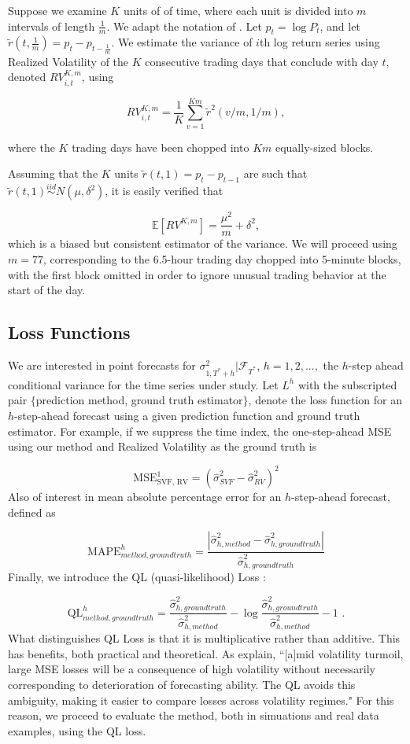 \documentclass[11pt,3p,review,authoryear]{elsarticle}
\newcommand{\simiid}{\stackrel{iid}{\sim}} %
\def\E{\mathbb{E}} %
\theoremstyle{definition}
\begin{document}
    Suppose we examine $K$ units of of time, where each unit is divided into $m$ intervals of length $\frac{1}{m}$.  We adapt the notation of \citet{andersen2008realized}. Let $p_{t} = \log{P_{t}}$, and let $\tilde{r}(t,\frac{1}{m}) = p_{t} - p_{t-\frac{1}{m}}$.  We estimate the variance of $i$th log return series using Realized Volatility of the $K$ consecutive trading days that conclude with day $t$, denoted $RV_{i,t}^{K,m}$, using
    
    $$RV_{i,t}^{K,m} = \frac{1}{K}\sum^{Km}_{v=1}\tilde{r}^{2}(v/m,1/m),$$

    where the $K$ trading days have been chopped into $Km$ equally-sized blocks.

    Assuming that the $K$ units $\tilde{r}(t, 1) = p_{t} - p_{t-1}$ are such that $\tilde{r}(t, 1) \simiid N(\mu, \delta^{2})$, it is easily verified that 
    
    $$\E[RV^{K,m}] = \frac{\mu^{2}}{m} + \delta^{2},$$
    which is a biased but consistent estimator of the variance.  We will proceed using $m = 77$, corresponding to the 6.5-hour trading day chopped into 5-minute blocks, with the first block omitted in order to ignore unusual trading behavior at the start of the day.

\subsection{Loss Functions}\label{loss_function}

We are interested in point forecasts for $\sigma^{2}_{1,T^{*}+h}|\mathcal{F}_{T^{*}}$, $h=1,2,...,$ the $h$-step ahead conditional variance for the time series under study.  Let $L^{h}$ with the subscripted pair $\{$prediction method, ground truth estimator$\}$, denote the loss function for an $h$-step-ahead forecast using a given prediction function and ground truth estimator.  For example, if we suppress the time index, the one-step-ahead MSE using our method and Realized Volatility as the ground truth is

$$ \text{MSE}^{1}_{\text{SVF, RV}} = (\hat\sigma^{2}_{SVF} - \hat\sigma^{2}_{RV})^{2}$$
Also of interest in mean absolute percentage error for an $h$-step-ahead forecast, defined as

\[ 
\text{MAPE}^{h}_{method, ground truth} = \frac{|\hat\sigma^{2}_{h, method} - \hat\sigma^{2}_{h, ground truth}|}{\hat\sigma^{2}_{h, ground truth}}
\]
Finally, we introduce the QL (quasi-likelihood) Loss \citep{brownlees2011practical}:

\[ 
\text{QL}^{h}_{method, ground truth} = \frac{\hat\sigma^{2}_{h, ground truth}}{ \hat\sigma^{2}_{h, method}} - \log{\frac{\hat\sigma^{2}_{h, ground truth}}{ \hat\sigma^{2}_{h, method}}} -1 \text{ .}
\]
What distinguishes QL Loss is that it is multiplicative rather than additive.  This has benefits, both practical and theoretical.  As \citet{brownlees2011practical} explain, ``[a]mid volatility turmoil, large MSE
losses will be a consequence of high volatility without necessarily corresponding to
deterioration of forecasting ability. The QL avoids this ambiguity, making it easier to
compare losses across volatility regimes."  For this reason, we proceed to evaluate the method, both in simuations and real data examples, using the QL loss.
\end{document}
